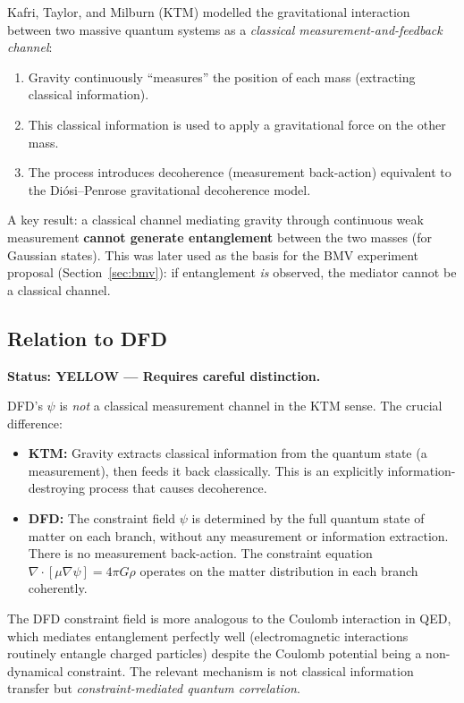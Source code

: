 \documentclass[12pt,a4paper]{article}
\newcommand{\YELLOW}{\textcolor{dfdyellow}{\textbf{YELLOW}}}
\begin{document}
Kafri, Taylor, and Milburn (KTM) modelled the gravitational interaction between two massive quantum systems as a \emph{classical measurement-and-feedback channel}:

\begin{enumerate}
\item Gravity continuously ``measures'' the position of each mass (extracting classical information).
\item This classical information is used to apply a gravitational force on the other mass.
\item The process introduces decoherence (measurement back-action) equivalent to the Di\'osi--Penrose gravitational decoherence model.
\end{enumerate}

A key result: a classical channel mediating gravity through continuous weak measurement \textbf{cannot generate entanglement} between the two masses (for Gaussian states). This was later used as the basis for the BMV experiment proposal (Section~\ref{sec:bmv}): if entanglement \emph{is} observed, the mediator cannot be a classical channel.

\subsection{Relation to DFD}

\textbf{Status: \YELLOW{} --- Requires careful distinction.}

DFD's $\psi$ is \emph{not} a classical measurement channel in the KTM sense. The crucial difference:

\begin{itemize}
\item \textbf{KTM:} Gravity extracts classical information from the quantum state (a measurement), then feeds it back classically. This is an explicitly information-destroying process that causes decoherence.

\item \textbf{DFD:} The constraint field $\psi$ is determined by the full quantum state of matter on each branch, without any measurement or information extraction. There is no measurement back-action. The constraint equation $\nabla\cdot[\mu\nabla\psi] = 4\pi G\rho$ operates on the matter distribution in each branch coherently.
\end{itemize}

The DFD constraint field is more analogous to the Coulomb interaction in QED, which mediates entanglement perfectly well (electromagnetic interactions routinely entangle charged particles) despite the Coulomb potential being a non-dynamical constraint. The relevant mechanism is not classical information transfer but \emph{constraint-mediated quantum correlation}.
\end{document}
